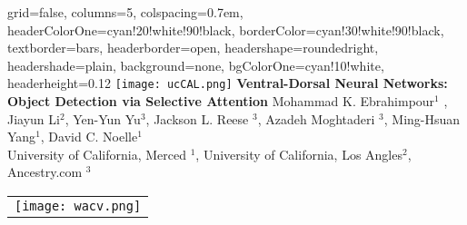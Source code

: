 \documentclass[landscape,paperwidth=76.0in,paperheight=36.0in,fontscale=0.292]{baposter}
\begin{document}
\begin{poster}{
 grid=false,
 columns=5,
 colspacing=0.7em,
 headerColorOne=cyan!20!white!90!black,
 borderColor=cyan!30!white!90!black,
 textborder=bars,
 headerborder=open,
 headershape=roundedright,
 headershade=plain,
 background=none,
 bgColorOne=cyan!10!white,
 headerheight=0.12\textheight}
 {
      \texttt{[image: ucCAL.png]}
      \makebox[0.01\textwidth]{} 
      \makebox[0.04\textwidth]{} 
 }
 {\sc\Huge\bf Ventral-Dorsal Neural Networks: Object Detection via Selective Attention}
 {\vspace{0.0em} Mohammad K. Ebrahimpour$^1$ , Jiayun Li$^2$, Yen-Yun Yu$^3$, Jackson L. Reese $^3$,  Azadeh Moghtaderi $^3$, Ming-Hsuan Yang$^1$, David C. Noelle$^1$  \\[0.2em]
 {University of California, Merced $^1$, University of California, Los Angles$^2$, Ancestry.com $^3$\\[0.2em] }}
 {
    \begin{tabular}{r}
        \texttt{[image: wacv.png]}
    \end{tabular}
 }


\end{poster}
\end{document}
